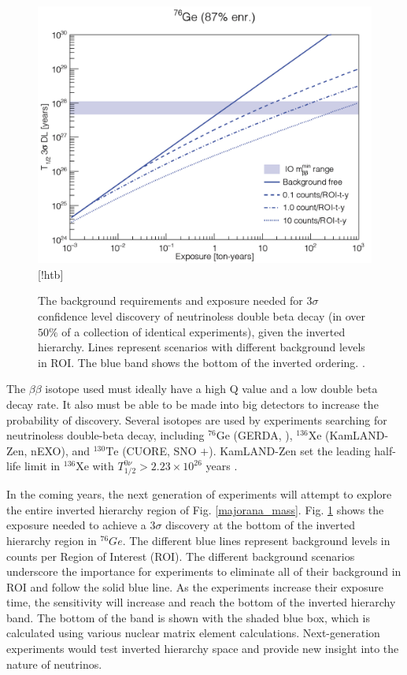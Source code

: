 \begin{figure}[!htb]
\centering
\includegraphics[width=0.8\linewidth]{ch1/figs/exposure_plot.png}[!htb]
\caption{The background requirements and exposure needed for 3$\sigma$ confidence level discovery of neutrinoless double beta decay (in over $50\%$ of a collection of identical experiments), given the inverted hierarchy. Lines represent scenarios with different background levels in ROI. The blue band shows the bottom of the inverted ordering. \cite{Gruszko:2017kfx}.}
\label{exposure_plot}
\end{figure}

The $\beta\beta$ isotope used must ideally have a high Q value and a low double beta decay rate. It also must be able to be made into big detectors to increase the probability of discovery. Several isotopes are used by experiments searching for neutrinoless double-beta decay, including ${}^{76}\mathrm{Ge}$ (GERDA\cite{GERDA_final}, {\MJD}\cite{Majorana_final}), ${}^{136}\mathrm{Xe}$ (KamLAND-Zen\cite{KamLAND-Zen:2024eml}, nEXO\cite{nEXO:2021ujk}), and ${}^{130}\mathrm{Te}$ (CUORE\cite{Arnaboldi2002du}, SNO $+$\cite{SNO_paper}). KamLAND-Zen set the leading half-life limit in $^{136}$Xe with $T^{0\nu}_{1/2} > 2.23 \times 10^{26}$ years \cite{KamLAND-Zen:2024eml}. 


In the coming years, the next generation of experiments will attempt to explore the entire inverted hierarchy region of Fig. \ref{majorana_mass}. Fig. \ref{exposure_plot} shows the exposure needed to achieve a $3\sigma$ discovery at the bottom of the inverted hierarchy region in ${}^{76}Ge$. The different blue lines represent background levels in counts per Region of Interest (ROI). The different background scenarios underscore the importance  for experiments to eliminate all of their background in ROI and follow the solid blue line. As the experiments increase their exposure time, the sensitivity will increase and reach the bottom of the inverted hierarchy band. The bottom of the band is shown with the shaded blue box, which is calculated using various nuclear matrix element calculations. Next-generation experiments would test inverted hierarchy space and provide new insight into the nature of neutrinos.

